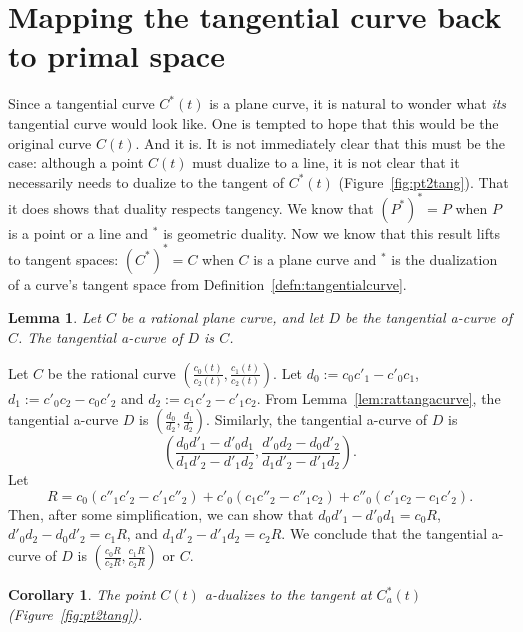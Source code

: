 \documentclass[12pt]{article}
\newcommand{\QED}{\vrule height 1.4ex width 1.0ex depth -.1ex\ \vspace{.3in}} %
\newcommand{\prf}{\noindent{{\bf Proof}:\ \ \ }}
\newtheorem{lemma}[theorem]{Lemma}
\newtheorem{corollary}[theorem]{Corollary}
\begin{document}

\section{Mapping the tangential curve back to primal space}
\label{sec:back}

Since a tangential curve $C^*(t)$ is a plane curve,
it is natural to wonder what {\em its} tangential curve would look like.
One is tempted to hope that this would be the original curve $C(t)$.
And it is.
It is not immediately clear that this must be the case: 
although a point $C(t)$ must dualize to a line, 
it is not clear that it necessarily needs to dualize to the tangent of $C^*(t)$ (Figure~\ref{fig:pt2tang}).
That it does shows that duality respects tangency.
We know that $(P^*)^* = P$ when $P$ is a point or a line and $^*$ is geometric duality.
Now we know that this result lifts to tangent spaces: 
$(C^*)^* = C$ when $C$ is a plane curve 
and $^*$ is the dualization of a curve's tangent space from Definition~\ref{defn:tangentialcurve}.

\begin{lemma}
Let $C$ be a rational plane curve, and
let $D$ be the tangential a-curve of $C$.
The tangential a-curve of $D$ is $C$.
\end{lemma}
\prf
Let $C$ be the rational curve $(\frac{c_0(t)}{c_2(t)},\frac{c_1(t)}{c_2(t)})$.
Let $d_0 := c_0c'_1 - c'_0c_1$, $d_1 := c'_0c_2 - c_0c'_2$
and $d_2 := c_1c'_2 - c'_1c_2$.
From Lemma~\ref{lem:rattangacurve}, 
the tangential a-curve $D$ is $(\frac{d_0}{d_2}, \frac{d_1}{d_2})$.
Similarly, the tangential a-curve of $D$ is 
\[
	(\frac{d_0 d'_1 - d'_0 d_1}{d_1 d'_2 - d'_1 d_2},
	 \frac{d'_0 d_2 - d_0 d'_2}{d_1 d'_2 - d'_1 d_2}).
\]
Let 
\begin{equation}
\label{eq:R}
	R = c_0(c''_1c'_2 - c'_1c''_2) + c'_0(c_1c''_2 - c''_1c_2) + c''_0(c'_1c_2 - c_1c'_2).
\end{equation}
Then, after some simplification, we can show that 
$d_0d'_1 - d'_0d_1 = c_0R$,
$d'_0 d_2 - d_0 d'_2 = c_1R$, and
$d_1 d'_2 - d'_1 d_2 = c_2R$.
We conclude that the tangential a-curve of $D$ is $(\frac{c_0R}{c_2R},\frac{c_1R}{c_2R})$
or $C$.
\QED

\begin{corollary}
The point $C(t)$ a-dualizes to the tangent at $C_a^*(t)$ (Figure~\ref{fig:pt2tang}).
\end{corollary}
\end{document}
